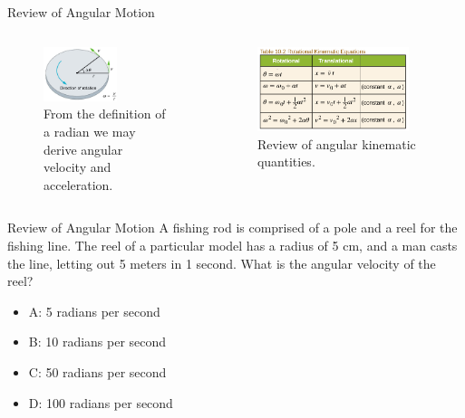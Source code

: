 \documentclass{beamer}
\begin{document}
\begin{frame}{Review of Angular Motion}
\begin{columns}[T]
\begin{column}{0.5\textwidth}
\begin{figure}
\centering
\includegraphics[width=0.6\textwidth]{figures/angle.png}
\caption{\label{fig:angle3} From the definition of a radian we may derive angular velocity and acceleration.}
\end{figure}
\end{column}
\begin{column}{0.5\textwidth}
\begin{figure}
\centering
\includegraphics[width=0.89\textwidth]{figures/angle3.png}
\caption{\label{fig:angle4} Review of angular kinematic quantities.}
\end{figure}
\end{column}
\end{columns}
\end{frame}

\begin{frame}{Review of Angular Motion}
A fishing rod is comprised of a pole and a reel for the fishing line.  The reel of a particular model has a radius of 5 cm, and a man casts the line, letting out 5 meters in 1 second.  What is the angular velocity of the reel?
\begin{itemize}
\item A: 5 radians per second
\item B: 10 radians per second
\item C: 50 radians per second
\item D: 100 radians per second
\end{itemize}
\end{frame}
\end{document}
